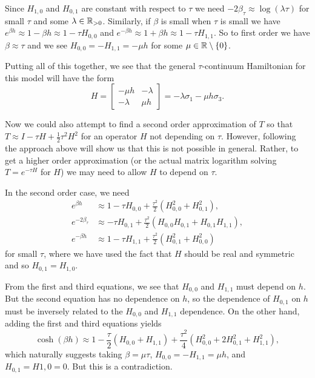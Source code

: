\documentclass[11pt,reqno]{amsart}
\numberwithin{equation}{section}
\begin{document}
	Since $H_{1,0}$ and $H_{0,1}$ are constant with respect to $\tau$ we need $-2\beta_\tau \approx \log (\lambda\tau)$ for small $\tau$ and some $\lambda\in \mathbb{R}_{>0}$. 
	Similarly, if $\beta$ is small when $\tau$ is small we have $e^{\beta h} \approx 1-\beta h \approx 1-\tau H_{0,0}$ and $e^{-\beta h} \approx 1+\beta h \approx 1-\tau H_{1,1}$. 
	So to first order we have $\beta \approx \tau$ and we see $H_{0,0}=-H_{1,1}=-\mu h$ for some $\mu \in \mathbb{R}\setminus\{0\}$. 
	
	Putting all of this together, we see that the general $\tau$-continuum Hamiltonian for this model will have the form 
	\[ H=\begin{bmatrix}
	-\mu h & -\lambda \\
	-\lambda & \mu h
	\end{bmatrix}=-\lambda\sigma_1-\mu h\sigma_3.\]
	
	Now we could also attempt to find a second order approximation of $T$ so that $T\approx I - \tau H + \frac{1}{2}\tau^2 H^2$ for an operator $H$ not depending on $\tau$. 
	However, following the approach above will show us that this is not possible in general.  
	Rather, to get a higher order approximation (or the actual matrix logarithm solving $T=e^{-\tau H}$ for $H$) we may need to allow $H$ to depend on $\tau$. 
	
	In the second order case, we need 
	\begin{align*}
		e^{\beta h} &\approx 1- \tau H_{0,0}+\frac{\tau^2}{2}(H_{0,0}^2+H_{0,1}^2),\\
		e^{-2\beta_\tau} &\approx -\tau H_{0,1}+\frac{\tau^2}{2}(H_{0,0}H_{0,1}+H_{0,1}H_{1,1}),\\
		e^{-\beta h} &\approx 1 - \tau H_{1,1}+\frac{\tau^2}{2}(H_{0,1}^2+H_{0,0}^2)
	\end{align*}
	for small $\tau$, where we have used the fact that $H$ should be real and symmetric and so $H_{0,1}=H_{1,0}$.
	
	From the first and third equations, we see that $H_{0,0}$ and $H_{1,1}$ must depend on $h$. 
	But the second equation has no dependence on $h$, so the dependence of $H_{0,1}$ on $h$ must be inversely related to the $H_{0,0}$ and $H_{1,1}$ dependence.
	On the other hand, adding the first and third equations yields
	\[\cosh(\beta h) \approx 1-\frac{\tau}{2}( H_{0,0}+ H_{1,1})+\frac{\tau^2}{4}(H_{0,0}^2+2H_{0,1}^2+H_{1,1}^2), \]
	which naturally suggests  taking $\beta=\mu\tau$, $H_{0,0}=-H_{1,1}=\mu h$, and $H_{0,1}=H{1,0}=0$. But this is a contradiction.
	
\end{document}
